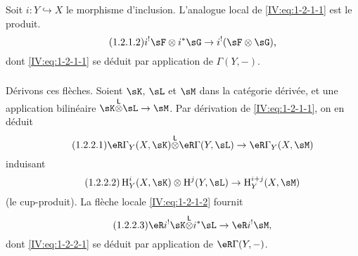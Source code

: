 Soit $i:Y\hookrightarrow X$ le morphisme d'inclusion. L'analogue local de 
\eqref{IV:eq:1-2-1-1} est le produit.
\begin{equation*}\tag{1.2.1.2}\label{IV:eq:1-2-1-2}
  i^!\sF\otimes i^*\sG \to i^!(\sF\otimes\sG) \text{,}
\end{equation*}
dont \eqref{IV:eq:1-2-1-1} se déduit par application de $\Gamma(Y,-)$. 





\subsubsection{}\label{IV:1-2-2}

Dérivons ces flèches. Soient $\sK$, $\sL$ et $\sM$ dans la catégorie 
dérivée, et une application bilinéaire $\sK\lotimes\sL\to\sM$. Par 
dérivation de \eqref{IV:eq:1-2-1-1}, on en déduit 
\begin{equation*}\tag{1.2.2.1}\label{IV:eq:1-2-2-1}
  \eR\Gamma_Y(X,\sK) \lotimes \eR\Gamma(Y,\sL) \to \eR\Gamma_Y(X,\sM) 
\end{equation*}
induisant 
\begin{equation*}\tag{1.2.2.2}\label{IV:eq:1-2-2-2}
  \h_Y^i(X,\sK)\otimes \h^j(Y,\sL) \to \h_Y^{i+j}(X,\sM)
\end{equation*}
(le cup-produit). La flèche locale \eqref{IV:eq:1-2-1-2} fournit 
\begin{equation*}\tag{1.2.2.3}\label{IV:eq:1-2-2-3}
  \eR i^! \sK\lotimes i^*\sL \to \eR i^!\sM \text{,}
\end{equation*}
dont \eqref{IV:eq:1-2-2-1} se déduit par application de $\eR\Gamma(Y,-)$. 





\subsubsection{}\label{IV:1-2-3}

